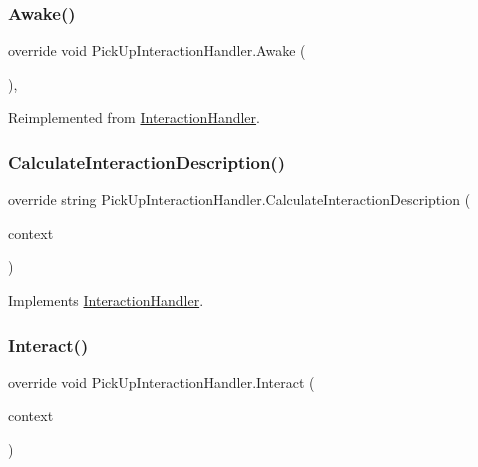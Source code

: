 \subsubsection{\texorpdfstring{Awake()}{Awake()}}
{\footnotesize\ttfamily override void Pick\+Up\+Interaction\+Handler.\+Awake (\begin{DoxyParamCaption}{ }\end{DoxyParamCaption})\hspace{0.3cm}{\ttfamily [protected]}, {\ttfamily [virtual]}}



Reimplemented from \mbox{\hyperlink{class_interaction_handler_adbbb312d562d3060de296f6da5c97631}{Interaction\+Handler}}.

\mbox{\label{class_pick_up_interaction_handler_ab989c9d6c0e2f7849c7c6cbf7b0827fd}} 
\subsubsection{\texorpdfstring{Calculate\+Interaction\+Description()}{CalculateInteractionDescription()}}
{\footnotesize\ttfamily override string Pick\+Up\+Interaction\+Handler.\+Calculate\+Interaction\+Description (\begin{DoxyParamCaption}\item[{\mbox{\hyperlink{class_interaction_context}{Interaction\+Context}}}]{context }\end{DoxyParamCaption})\hspace{0.3cm}{\ttfamily [virtual]}}



Implements \mbox{\hyperlink{class_interaction_handler_acdd154cb8b276e122915412b3b7274d3}{Interaction\+Handler}}.

\mbox{\label{class_pick_up_interaction_handler_a4f55440deca34467164222fbbed1c409}} 
\subsubsection{\texorpdfstring{Interact()}{Interact()}}
{\footnotesize\ttfamily override void Pick\+Up\+Interaction\+Handler.\+Interact (\begin{DoxyParamCaption}\item[{\mbox{\hyperlink{class_interaction_context}{Interaction\+Context}}}]{context }\end{DoxyParamCaption})\hspace{0.3cm}{\ttfamily [virtual]}}



